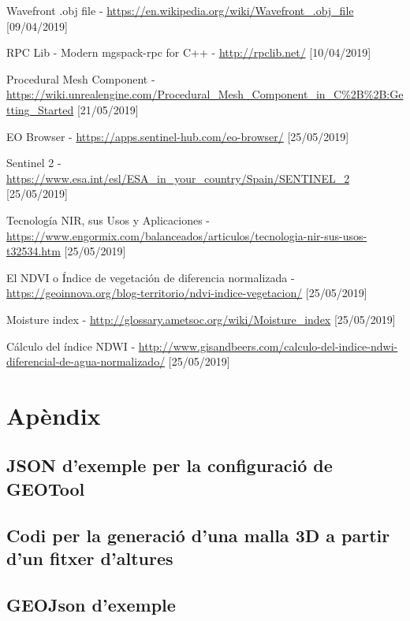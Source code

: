 \documentclass[10pt,a4paper,twocolumn,twoside]{article}
\begin{document}
\begin{thebibliography}{11}
Wavefront .obj file - \url{https://en.wikipedia.org/wiki/Wavefront_.obj_file} [09/04/2019]

RPC Lib - Modern mgspack-rpc for C++ - \url{http://rpclib.net/} [10/04/2019]

Procedural Mesh Component - \url{https://wiki.unrealengine.com/Procedural_Mesh_Component_in_C%2B%2B:Getting_Started} [21/05/2019]

EO Browser - \url{https://apps.sentinel-hub.com/eo-browser/} [25/05/2019]

Sentinel 2 - \url{https://www.esa.int/esl/ESA_in_your_country/Spain/SENTINEL_2} [25/05/2019]

Tecnología NIR, sus Usos y Aplicaciones - \url{https://www.engormix.com/balanceados/articulos/tecnologia-nir-sus-usos-t32534.htm} [25/05/2019]

El NDVI o Índice de vegetación de diferencia normalizada - \url{https://geoinnova.org/blog-territorio/ndvi-indice-vegetacion/} [25/05/2019]

Moisture index - \url{http://glossary.ametsoc.org/wiki/Moisture_index} [25/05/2019]

Cálculo del índice NDWI - \url{http://www.gisandbeers.com/calculo-del-indice-ndwi-diferencial-de-agua-normalizado/} [25/05/2019]

\end{thebibliography}

\appendix
\section*{Apèndix}

\setcounter{section}{1}

\subsection{JSON d'exemple per la configuració de GEOTool}
\label{appendix:geotoolconfig}


\subsection{Codi per la generació d'una malla 3D a partir d'un fitxer d'altures}
\label{appendix:generateobj}


\subsection{GEOJson d'exemple}
\label{appendix:geojson}

\end{document}
